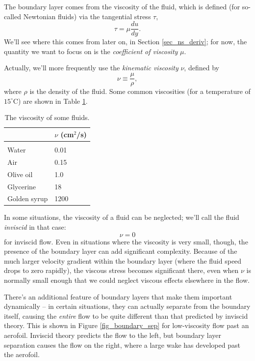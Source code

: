 The boundary layer comes from the viscosity of the fluid, which is defined (for so-called Newtonian fluids) via the tangential stress $\tau$,
\begin{equation}
\label{eq_visc_def}
\tau = \mu \frac{du}{dy}.
\end{equation}
We'll see where this comes from later on, in Section \ref{sec_ns_deriv}; for now, the quantity we want to focus on is the \emph{coefficient of viscosity} $\mu$.

Actually, we'll more frequently use the \emph{kinematic viscosity} $\nu$, defined by
$$
\nu \equiv \frac{\mu}{\rho},
$$
where $\rho$ is the density of the fluid. Some common viscosities (for a temperature of $15^\circ$C) are shown in Table \ref{tab_viscosity}.

\begin{table}[t]
\centering
  \begin{tabular}{l|l}
  & $\nu$ (cm$^2$/s) \\
  \hline \\
  Water & 0.01 \\
  Air & 0.15 \\
  Olive oil & 1.0 \\
  Glycerine & 18 \\
  Golden syrup & 1200
  \end{tabular}
  \caption{The viscosity of some fluids.}
  \label{tab_viscosity}
\end{table}

In some situations, the viscosity of a fluid can be neglected; we'll call the fluid \emph{inviscid} in that case:
\begin{equation}
\boxed{
\nu = 0
}
\end{equation}
for inviscid flow.  Even in situations where the viscosity is very small, though, the presence of the boundary layer can add significant complexity.  Because of the much larger velocity gradient within the boundary layer (where the fluid speed drops to zero  rapidly), the viscous stress becomes significant there, even when $\nu$ is normally small enough that we could neglect viscous effects elsewhere in the flow.

There's an additional feature of boundary layers that make them important dynamically -- in certain situations, they can actually separate from the boundary itself, causing the \emph{entire} flow to be quite different than that predicted by inviscid theory.  This is shown in Figure \ref{fig_boundary_sep} for low-viscosity flow past an aerofoil.  Inviscid theory predicts the flow to the left, but boundary layer separation causes the flow on the right, where a large wake has developed past the aerofoil.


